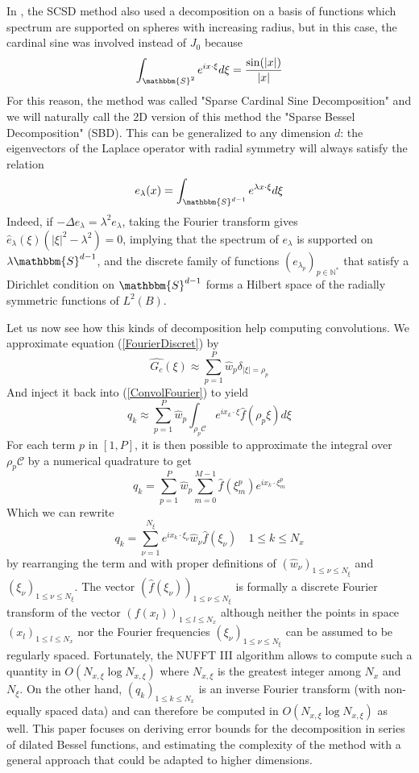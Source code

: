 \documentclass[11pt,a4paper]{article}
\begin{document}
In \cite{Alouges2015}, the SCSD method also used a decomposition on a basis of functions which spectrum are supported on spheres with increasing radius, but in this case, the cardinal sine was involved instead of $J_0$ because
\[ \int_{\mathbbm{S}^2} e^{i x\cdot \xi}d\xi = \dfrac{\sin(|x|)}{|x|}\] 
For this reason, the method was called "Sparse Cardinal Sine Decomposition" and we  will naturally call the 2D version of this method the "Sparse Bessel Decomposition" (SBD). This can be generalized to any dimension $d$: the eigenvectors of the Laplace operator with radial symmetry will always satisfy the relation 
\[e_\lambda(x) = \int_{\mathbbm{S}^{d-1}} e^{\lambda x\cdot \xi}d\xi\]
Indeed, if $- \Delta e_\lambda = \lambda^2 e_\lambda$, taking the Fourier transform gives $\hat{e}_{\lambda}(\xi) (|\xi|^2 - \lambda^2) = 0$, implying that the spectrum of $e_{\lambda}$ is supported on $\lambda \mathbbm{S}^{d-1}$, and the discrete family of functions $(e_{\lambda_p})_{p \in \mathbb{N}^*}$ that satisfy a Dirichlet condition on $\mathbbm{S}^{d-1}$ forms a Hilbert space of the radially symmetric functions of $L^2(B)$. 

Let us now see how this kinds of decomposition help computing convolutions. We approximate equation (\ref{FourierDiscret}) by 
\[\hat{G_c}(\xi) \approx \sum_{p =1}^P \hat{w}_p \delta_{|\xi| = \rho_p}\]
And inject it back into (\ref{ConvolFourier}) to yield 
\[q_k \approx \sum_{p=1}^P \hat{w}_p \int_{\rho_p \mathcal{C}}  e^{i x_k \cdot \xi} \hat{f}(\rho_p \xi) d\xi \]
For each term $p$ in $[1,P]$, it is then possible to approximate the integral over $\rho_p\mathcal{C}$ by a numerical quadrature to get 
\[ q_k = \sum_{p=1}^P \hat{w}_p \sum_{m = 0}^{M-1}  \hat{f}(\xi_m^p) e^{i x_k \cdot \xi_m^p }\]
Which we can rewrite 
\[q_k = \sum_{\nu=1}^{N_{\xi}} e^{i x_k \cdot \xi_\nu } \hat{w}_\nu \hat{f}(\xi_\nu) \quad  1\leq k \leq N_x\]
by rearranging the term and with proper definitions of $(\hat{w}_{\nu})_{1 \leq \nu \leq N_\xi}$ and $(\xi_{\nu})_{1 \leq \nu \leq N_{\xi}}$. The vector $(\hat{f}(\xi_{\nu}))_{1 \leq \nu \leq N_{\xi}}$ is formally a discrete Fourier transform of the vector $(f(x_l))_{1 \leq l \leq N_x}$ although neither the points in space $(x_l)_{1 \leq l \leq N_x}$ nor the Fourier frequencies $(\xi_\nu)_{1 \leq \nu \leq N_{\xi}}$ can be assumed to be regularly spaced. Fortunately, the NUFFT III algorithm \cite{NuFFT} allows to compute such a quantity in $O(N_{x,\xi} \log N_{x,\xi})$ where $N_{x,\xi}$ is the greatest integer among $N_x$ and $N_\xi$. On the other hand, $(q_k)_{1\leq k \leq N_x}$ is an inverse Fourier transform (with non-equally spaced data) and can therefore be computed in $O(N_{x,\xi} \log N_{x,\xi})$ as well. 
This paper focuses on deriving error bounds for the decomposition in series of dilated Bessel functions, and estimating the complexity of the method with a general approach that could be adapted to higher dimensions.  
  
\end{document}
